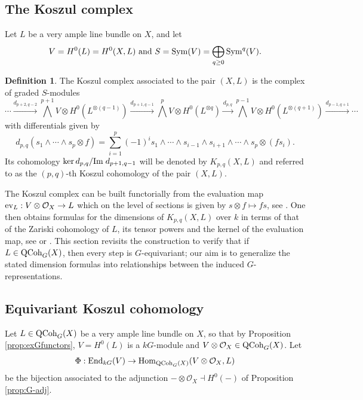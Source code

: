 \documentclass[10pt]{amsart}
\theoremstyle{definition}
\newtheorem{definition}[theorem]{Definition}
\begin{document}
\subsection{The Koszul complex}
Let $L$ be a very ample line bundle on $X$, and let 
\[
V=H^0(L)=H^0(X,L)\text{ and }S={\rm Sym}(V)=\bigoplus_{q\geq 0}{\rm Sym}^q(V).
\]
\begin{definition}\label{def:Koszul}
The Koszul complex associated to the pair $(X,L)$ is the complex of graded $S$-modules 
\[
\cdots
\overset{d_{p+2,q-2}}{\longrightarrow} 
\bigwedge^{p+1}V\otimes H^0(L^{\otimes (q-1)})
\overset{d_{p+1,q-1}}{\longrightarrow} 
\bigwedge^{p}V\otimes H^0(L^{\otimes q})\overset{d_{p,q}}{\longrightarrow} 
\bigwedge^{p-1}V\otimes H^0(L^{\otimes (q+1)})\overset{d_{p-1,q+1}}{\longrightarrow}\cdots
\]
with differentials given by
\[
d_{p,q}(s_1\wedge\cdots \wedge s_p\otimes f)=\sum_{i=1}^p(-1)^is_1\wedge\cdots\wedge s_{i-1}\wedge s_{i+1}\wedge \cdots \wedge s_p\otimes (fs_i).
\]
Its cohomology $ \ker d_{p,q}/{\rm Im}\;d_{p+1,q-1}$ will be denoted by $K_{p,q}(X,L)$ and referred to as the $(p,q)$-th Koszul cohomology of the pair $(X,L)$.
\end{definition}

The Koszul complex can be built functorially from the evaluation map ${\rm ev}_L:V\otimes\mathcal{O}_X\rightarrow L$ which on the level of sections is given by $s\otimes f\mapsto fs$, see \cite[\S2.1]{MR2573635}. One then obtains formulas for the dimensions of $K_{p,q}(X,L)$ over $k$ in terms of that of the Zariski cohomology of $L$, its tensor powers and the kernel of the evaluation map, see \cite[Proposition 2.5]{MR2573635} or \cite[Proposition 3.2]{MR3729076}. This section revisits the construction to verify that if $L\in{\rm QCoh}_G(X)$, then every step is $G$-equivariant; our aim is to generalize the stated dimension formulas into relationships between the induced $G$-representations.\\

\subsection{Equivariant Koszul cohomology}
Let $L\in{\rm QCoh}_G(X)$ be a very ample line bundle on $X$, so that by Proposition \ref{prop:exGfunctors}, $V=H^0(L)$ is a $kG$-module and $V\otimes \mathcal{O}_X\in{\rm QCoh}_G(X)$. Let 
\[
\Phi:{\rm End}_{kG}(V)\rightarrow{\rm Hom}_{{\rm QCoh}_G(X)}(V\otimes \mathcal{O}_X,L)
\]
be the bijection associated to the adjunction $-\otimes \mathcal{O}_X\dashv H^0(-)$ of Proposition \ref{prop:G-adj}.
\end{document}
